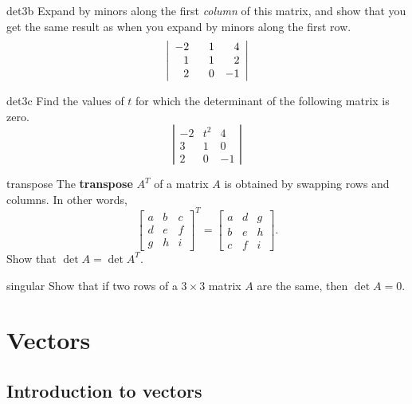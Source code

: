 \documentclass{watsonbook}
\begin{document}
\begin{exercise}{}{det3b}
  Expand by minors along the first \textit{column} of this matrix, and
  show that you get the same result as when you expand by minors along
  the first row.
  \[
    \left|
      \begin{array}{ccc} -2 & \hphantom{-}1 & \hphantom{-}4 \\
        \hphantom{-}1 & \hphantom{-}1 & \hphantom{-}2 \\ \hphantom{-}2
                            & \hphantom{-}0 & -1
      \end{array}
    \right|
  \]
\end{exercise}

\begin{exercise}{}{det3c}
  Find the values of $t$ for which the determinant of the following matrix is zero.  
  \[
    \left|\begin{array}{ccc} -2 & t^2 & 4 \\  3 & 1 & 0 \\ 2 & 0  & -1 \end{array}\right|
  \]
\end{exercise}

\begin{exercise}{}{transpose}
  The \textbf{transpose} $A^T$ of a matrix $A$ is obtained by swapping rows and
  columns. In other words,
  \[
    \left[
      \begin{array}{ccc} a & b & c
        \\ d & e & f
        \\ g & h &i
      \end{array}
    \right]^T
    =
    \left[
      \begin{array}{ccc}
        a & d & g\\ b & e & h \\ c & f & i
      \end{array}
    \right]. 
  \]
  Show  that $\det A = \det A^T$. 
\end{exercise}

\begin{exercise}{}{singular}
  Show that if two rows of a $3 \times 3$ matrix $A$ are the same,
  then $\det A = 0$. 
\end{exercise}

\chapter{Vectors}

\section{Introduction to vectors} \label{sec:vectors} 
\end{document}
